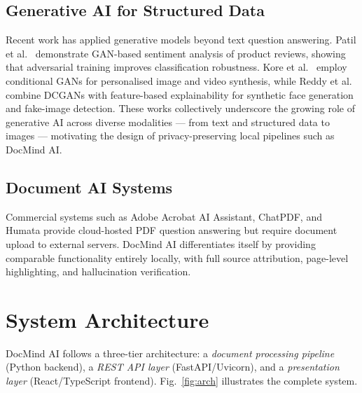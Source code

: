 \documentclass[conference]{IEEEtran}
\begin{document}
\subsection{Generative AI for Structured Data}
Recent work has applied generative models beyond text question answering.
Patil et al.~\cite{patil2025gan} demonstrate GAN-based sentiment
analysis of product reviews, showing that adversarial training improves
classification robustness.
Kore et al.~\cite{kore2026cgan} employ conditional GANs for personalised
image and video synthesis, while Reddy et al.~\cite{reddy2026dcgan}
combine DCGANs with feature-based explainability for synthetic face
generation and fake-image detection.
These works collectively underscore the growing role of generative AI
across diverse modalities — from text and structured data to images —
motivating the design of privacy-preserving local pipelines such as
DocMind AI.

\subsection{Document AI Systems}
Commercial systems such as Adobe Acrobat AI Assistant, ChatPDF, and
Humata provide cloud-hosted PDF question answering but require document
upload to external servers.
DocMind AI differentiates itself by providing comparable functionality
entirely locally, with full source attribution, page-level highlighting,
and hallucination verification.

\section{System Architecture}
\label{sec:arch}

DocMind AI follows a three-tier architecture: a \emph{document
processing pipeline} (Python backend), a \emph{REST API layer}
(FastAPI/Uvicorn), and a \emph{presentation layer}
(React/TypeScript frontend).
Fig.~\ref{fig:arch} illustrates the complete system.
\end{document}
